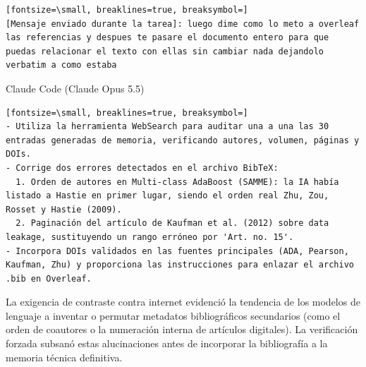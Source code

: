\documentclass[12pt,a4paper,oneside]{book}
\begin{document}
\begin{iaprompt}
\begin{iaprompt}
\begin{Verbatim}[fontsize=\small, breaklines=true, breaksymbol=]
[Mensaje enviado durante la tarea]: luego dime como lo meto a overleaf las referencias y despues te pasare el documento entero para que puedas relacionar el texto con ellas sin cambiar nada dejandolo verbatim a como estaba
\end{Verbatim}
\end{iaprompt}
\begin{iaresp}{Claude Code (Claude Opus 5.5)}
\begin{Verbatim}[fontsize=\small, breaklines=true, breaksymbol=]
- Utiliza la herramienta WebSearch para auditar una a una las 30 entradas generadas de memoria, verificando autores, volumen, páginas y DOIs.
- Corrige dos errores detectados en el archivo BibTeX:
  1. Orden de autores en Multi-class AdaBoost (SAMME): la IA había listado a Hastie en primer lugar, siendo el orden real Zhu, Zou, Rosset y Hastie (2009).
  2. Paginación del artículo de Kaufman et al. (2012) sobre data leakage, sustituyendo un rango erróneo por 'Art. no. 15'.
- Incorpora DOIs validados en las fuentes principales (ADA, Pearson, Kaufman, Zhu) y proporciona las instrucciones para enlazar el archivo .bib en Overleaf.
\end{Verbatim}
\end{iaresp}
\begin{iaanalisis}
La exigencia de contraste contra internet evidenció la tendencia de los modelos de lenguaje a inventar o permutar metadatos bibliográficos secundarios (como el orden de coautores o la numeración interna de artículos digitales). La verificación forzada subsanó estas alucinaciones antes de incorporar la bibliografía a la memoria técnica definitiva.
\end{iaanalisis}



\end{iaprompt}
\end{document}
